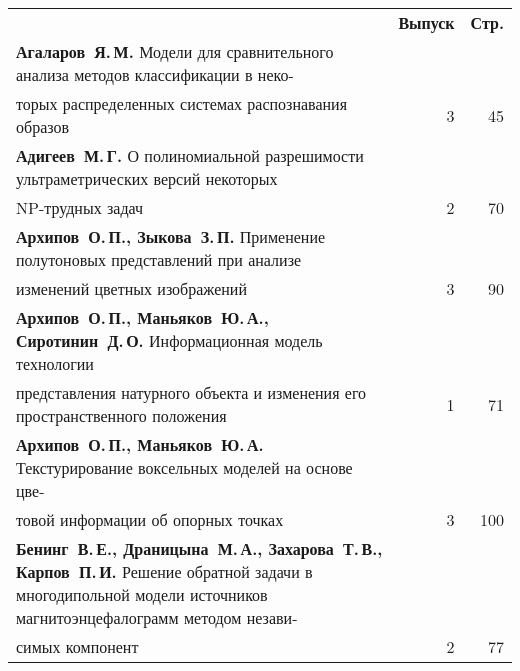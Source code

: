 {\tabcolsep=3pt
\begin{tabular}{p{388pt}rr}
&\textbf{Выпуск} & \textbf{Стр.}\\[6pt]

\textbf{Агаларов~Я.\,М.} Модели для сравнительного анализа методов классификации в
неко-\linebreak
\vspace*{-12pt}\\
\hspace*{23pt}торых распределенных системах распознавания образов\dotfill&3&45\\
\textbf{Адигеев~М.\,Г.} О полиномиальной разрешимости ультраметрических версий
некоторых\linebreak
\vspace*{-12pt}\\
\hspace*{23pt}NP-трудных задач\dotfill&2&70\\
\textbf{Архипов~О.\,П., Зыкова~З.\,П.} Применение полутоновых представлений при
анализе\linebreak
\vspace*{-12pt}\\
\hspace*{23pt}изменений цветных изображений\dotfill&3&90\\
\textbf{Архипов~О.\,П., Маньяков~Ю.\,А., Сиротинин~Д.\,О.} Информационная модель
технологии\linebreak
\vspace*{-12pt}\\
\hspace*{23pt}представления натурного объекта и изменения его пространственного
положения\dotfill&1&71\\
\textbf{Архипов~О.\,П., Маньяков~Ю.\,А.} Текстурирование воксельных моделей на
основе цве-\linebreak
\vspace*{-12pt}\\
\hspace*{23pt}товой информации об опорных точках\dotfill&3&100\\
\hangindent=23pt\noindent\textbf{Бенинг~В.\,Е., Драницына~М.\,А., Захарова~Т.\,В., Карпов~П.\,И.} Решение
обратной задачи в многодипольной модели источников магнитоэнцефалограмм методом
незави-\linebreak
\vspace*{-12pt}\\
\hspace*{23pt}симых компонент\dotfill&2&77\\

\end{tabular}}
